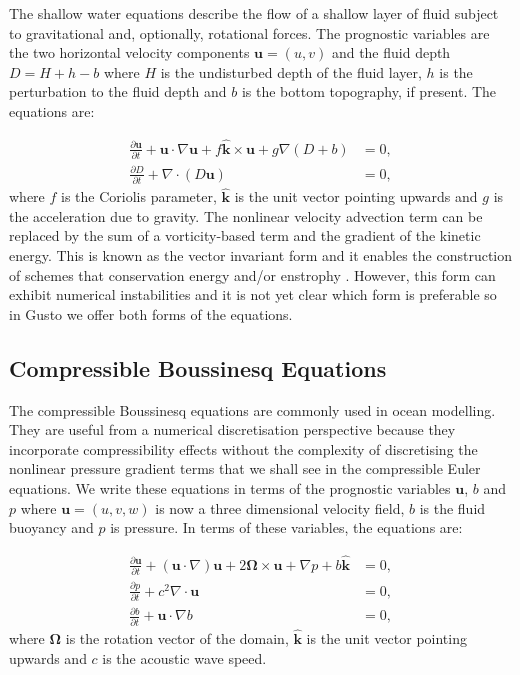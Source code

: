 \documentclass[journal abbreviation, manuscript]{copernicus}
\def\MM#1{\boldsymbol{#1}}
\newcommand{\pp}[2]{\frac{\partial #1}{\partial #2}}
\begin{document}
The shallow water equations describe the flow of a shallow layer of
fluid subject to gravitational and, optionally, rotational forces. The
prognostic variables are the two horizontal velocity components
$\MM{u} = (u, v)$ and the fluid depth $D = H + h - b$ where $H$ is the
undisturbed depth of the fluid layer, $h$ is the perturbation to the
fluid depth and $b$ is the bottom topography, if present. The
equations are:

\begin{align}
  \pp{\MM{u}}{t} + \MM{u}\cdot\nabla\MM{u} + f\hat{\MM{k}}\times\MM{u} + g\nabla (D+b) &= 0, \\
  \pp{D}{t} + \nabla\cdot(D\MM{u}) &= 0,
\end{align}
where $f$ is the Coriolis parameter, $\hat{\MM{k}}$ is the unit vector
pointing upwards and $g$ is the acceleration due to gravity. The
nonlinear velocity advection term can be replaced by the sum of a
vorticity-based term and the gradient of the kinetic energy. This is
known as the vector invariant form and it enables the construction of
schemes that conservation energy and/or enstrophy
\citep{mcrae2014energy, bauer2018energy, wimmer2020energy,
  wimmer2021energy}. However, this form can exhibit numerical
instabilities \citep{bell2017numerical} and it is not yet clear which
form is preferable so in Gusto we offer both forms of the equations.

\subsection{Compressible Boussinesq Equations}
The compressible Boussinesq equations are commonly used in ocean
modelling. They are useful from a numerical discretisation perspective
because they incorporate compressibility effects without the
complexity of discretising the nonlinear pressure gradient terms that
we shall see in the compressible Euler equations. We write these
equations in terms of the prognostic variables $\MM{u}$, $b$ and
$p$ where $\MM{u}=(u, v, w)$ is now a three dimensional velocity
field, $b$ is the fluid buoyancy and $p$ is pressure. In terms of
these variables, the equations are:

\begin{align}
  \pp{\MM{u}}{t} + 
  (\MM{u}\cdot\nabla)\MM{u} +
  2\MM{\Omega}\times \MM{u} + \nabla p + b\hat{\MM{k}} & = 0, \\
  \pp{p}{t} + c^2\nabla\cdot\MM{u} & = 0, \\
  \pp{b}{t} + \MM{u}\cdot\nabla b & = 0,
\end{align}
where $\MM{\Omega}$ is the rotation vector of the domain,
$\hat{\MM{k}}$ is the unit vector pointing upwards and $c$ is the
acoustic wave speed.
\end{document}
